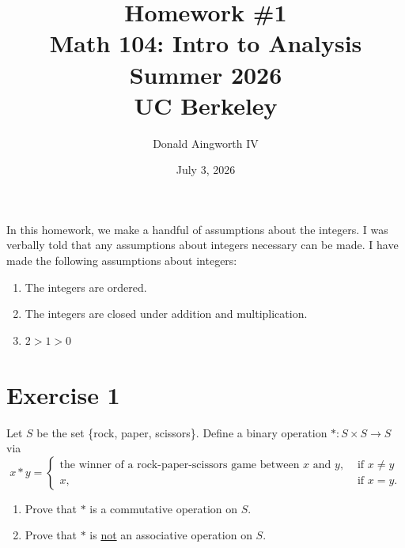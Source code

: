\documentclass[11pt]{article}
\title{Homework \#1\\{\large Math 104: Intro to Analysis \\ Summer 2026} \\ {\normalsize UC Berkeley}}
\date{July 3, 2026}
\author{Donald Aingworth IV}
\begin{document}
\renewcommand\qedsymbol{OE$\Delta$}
\newcommand{\abs}[1]{\left| #1 \right|}
\newcommand{\andtxt}{\text{ and }}
\newcommand{\Ais}{\ensuremath{\overset{A}{=}}}
\newcommand{\Cis}{\ensuremath{\overset{C}{=}}}
\newcommand{\mathif}{\text{if }}
\newcommand{\seq}[2][n]{\ensuremath{(#2 _{#1})}}
\newcommand{\zz}[1]{$\mathbb{Z}/ #1 \mathbb{Z}$}

\maketitle

In this homework, we make a handful of assumptions about the integers.
I was verbally told that any assumptions about integers necessary can be made.
I have made the following assumptions about integers:
\begin{enumerate}
    \item   The integers are ordered.
    \item   The integers are closed under addition and multiplication.
    \item   $2 > 1 > 0$
\end{enumerate}

\tableofcontents

\pagebreak
\section{Exercise 1}
    Let $S$ be the set \{rock, paper, scissors\}. Define a binary operation $\ast: S \times S \to S$ via
    \begin{equation*}
        x \ast y = 
        \begin{cases}
            \text{the winner of a rock-paper-scissors game between $x$ and $y$}, & \text{ if } x \neq y\\
            x, & \text{ if } x = y.
        \end{cases}
    \end{equation*}
    \begin{enumerate}[label=(\alph*)]
        \item 
        Prove that $\ast$ is a commutative operation on $S$.

        \item 
        Prove that $\ast$ is \underline{not} an associative operation on $S$.
    \end{enumerate}
\end{document}

